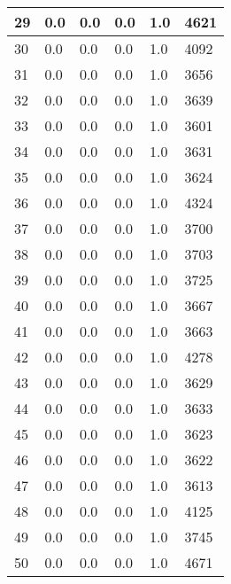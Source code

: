 \begin{longtable}{|l|l|l|l|l|l|}
29 & 0.0 & 0.0 & 0.0 & 1.0 & 4621 \\ \hline 
30 & 0.0 & 0.0 & 0.0 & 1.0 & 4092 \\ \hline 
31 & 0.0 & 0.0 & 0.0 & 1.0 & 3656 \\ \hline 
32 & 0.0 & 0.0 & 0.0 & 1.0 & 3639 \\ \hline 
33 & 0.0 & 0.0 & 0.0 & 1.0 & 3601 \\ \hline 
34 & 0.0 & 0.0 & 0.0 & 1.0 & 3631 \\ \hline 
35 & 0.0 & 0.0 & 0.0 & 1.0 & 3624 \\ \hline 
36 & 0.0 & 0.0 & 0.0 & 1.0 & 4324 \\ \hline 
37 & 0.0 & 0.0 & 0.0 & 1.0 & 3700 \\ \hline 
38 & 0.0 & 0.0 & 0.0 & 1.0 & 3703 \\ \hline 
39 & 0.0 & 0.0 & 0.0 & 1.0 & 3725 \\ \hline 
40 & 0.0 & 0.0 & 0.0 & 1.0 & 3667 \\ \hline 
41 & 0.0 & 0.0 & 0.0 & 1.0 & 3663 \\ \hline 
42 & 0.0 & 0.0 & 0.0 & 1.0 & 4278 \\ \hline 
43 & 0.0 & 0.0 & 0.0 & 1.0 & 3629 \\ \hline 
44 & 0.0 & 0.0 & 0.0 & 1.0 & 3633 \\ \hline 
45 & 0.0 & 0.0 & 0.0 & 1.0 & 3623 \\ \hline 
46 & 0.0 & 0.0 & 0.0 & 1.0 & 3622 \\ \hline 
47 & 0.0 & 0.0 & 0.0 & 1.0 & 3613 \\ \hline 
48 & 0.0 & 0.0 & 0.0 & 1.0 & 4125 \\ \hline 
49 & 0.0 & 0.0 & 0.0 & 1.0 & 3745 \\ \hline 
50 & 0.0 & 0.0 & 0.0 & 1.0 & 4671 \\ \hline 
\end{longtable}